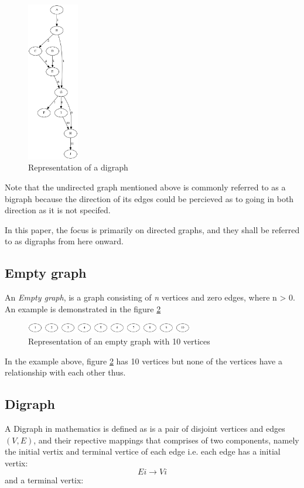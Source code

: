 \begin{figure}[H]
  \begin{center}
      \includegraphics[width=0.2\textwidth]{directedgraph.png}
  \end{center}    
  \caption{Representation of a digraph}
  \label{fig:directedgraph}
\end{figure} 
Note that the undirected graph mentioned above is commonly referred to as a bigraph because the direction
of its edges could be percieved as to going in both direction as it is not specifed.

In this paper, the focus is primarily on directed graphs, and they shall be referred to as digraphs from here onward.


\subsection{Empty graph}
An \textit{Empty graph}, is a graph consisting of \textit{n} vertices and zero edges, where n > 0. An example is demonstrated in the figure \ref{fig:empty_graph}
\begin{figure}[H]
  \begin{center}
      \includegraphics[width=0.65\textwidth]{empty.png}
  \end{center}    
  \caption{Representation of an empty graph with 10 vertices}
  \label{fig:empty_graph}
\end{figure}

In the example above, figure \ref{fig:empty_graph} has 10 vertices but none of the vertices have a relationship with each other thus.

\subsection{Digraph}
A Digraph in mathematics is defined as is a pair of disjoint vertices and edges $(V,E)$, and their repective mappings that comprises of two components, namely the initial vertix and 
terminal vertice of each edge i.e. each edge has a initial vertix: 
  \begin{equation}
    Ei\rightarrow Vi
  \end{equation} 
 and a terminal vertix:

